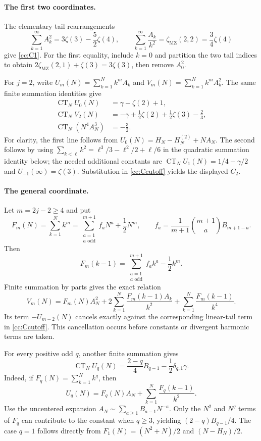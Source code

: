\paragraph{The first two coordinates.}
The elementary tail rearrangements
\[
 \sum_{k=1}^{\infty}A_k^2=3\zeta(3)-\frac52\zeta(4),\qquad
 \sum_{k=1}^{\infty}\frac{A_k}{k^2}=\zeta_{\mathrm{MZ}}(2,2)=\frac34\zeta(4)
\]
give \eqref{cc:C1}.  For the first equality, include $k=0$ and
partition the two tail indices to obtain
$2\zeta_{\mathrm{MZ}}(2,1)+\zeta(3)=3\zeta(3)$, then remove $A_0^2$.

For $j=2$, write
$U_m(N)=\sum_{k=1}^Nk^mA_k$ and
$V_m(N)=\sum_{k=1}^Nk^mA_k^2$.
The same finite summation identities give
\begin{align*}
 \operatorname{CT}_N U_0(N)&=\gamma-\zeta(2)+1,\\
 \operatorname{CT}_N V_2(N)&=-\gamma+\frac12\zeta(2)
                         +\frac12\zeta(3)-\frac23,\\
 \operatorname{CT}_N(N^4A_N^3)&=-\frac32.
\end{align*}
For clarity, the first line follows from
$U_0(N)=H_N-H_N^{(2)}+NA_N$.
The second follows by using
$\sum_{k<\ell}k^2=\ell^3/3-\ell^2/2+\ell/6$ in the
quadratic summation identity below; the needed additional constants are
$\operatorname{CT}_NU_1(N)=1/4-\gamma/2$ and
$U_{-1}(\infty)=\zeta(3)$.
Substitution in \eqref{cc:Ccutoff} yields the displayed $C_2$.

\paragraph{The general coordinate.}
Let $m=2j-2\ge4$ and put
\[
 F_m(N)=\sum_{k=1}^Nk^m
 =\sum_{\substack{a=1\\a\text{ odd}}}^{m+1}f_aN^a+\frac12N^m,
 \qquad
 f_a=\frac1{m+1}\binom{m+1}{a}B_{m+1-a}.
\]
Then
\[
 F_m(k-1)=\sum_{\substack{a=1\\a\text{ odd}}}^{m+1}f_ak^a-\frac12k^m.
\]
Finite summation by parts gives the exact relation
\begin{equation}\label{cc:quadraticcutoff}
 V_m(N)=F_m(N)A_N^2+
 2\sum_{k=1}^N\frac{F_m(k-1)A_k}{k^2}
 +\sum_{k=1}^N\frac{F_m(k-1)}{k^4}.
\end{equation}
Its term $-U_{m-2}(N)$ cancels exactly against the corresponding
linear-tail term in \eqref{cc:Ccutoff}.  This cancellation occurs
before constants or divergent harmonic terms are taken.

For every positive odd $q$, another finite summation gives
\begin{equation}\label{cc:oddlinear}
 \operatorname{CT}_NU_q(N)
   =\frac{2-q}{4}B_{q-1}-\frac12\delta_{q,1}\gamma.
\end{equation}
Indeed, if $F_q(N)=\sum_{k=1}^Nk^q$, then
\[
 U_q(N)=F_q(N)A_N+\sum_{k=1}^N\frac{F_q(k-1)}{k^2}.
\]
Use the uncentered expansion
$A_N\sim\sum_{a\ge1}B_{a-1}N^{-a}$.
Only the $N^2$ and $N^q$ terms of $F_q$ can contribute to the
constant when $q\ge3$, yielding $(2-q)B_{q-1}/4$.
The case $q=1$ follows directly from
$F_1(N)=(N^2+N)/2$ and $(N-H_N)/2$.


